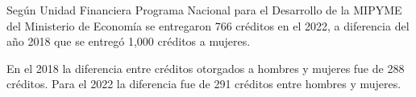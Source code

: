 Según Unidad Financiera Programa Nacional para el Desarrollo de la MIPYME del Ministerio de Economía se entregaron 766 créditos en el 2022, a diferencia del año 2018 que se entregó 1,000 créditos a mujeres.

En el 2018 la diferencia entre créditos otorgados a hombres y mujeres fue de 288 créditos. Para el 2022 la diferencia fue de 291 créditos entre hombres y mujeres. 